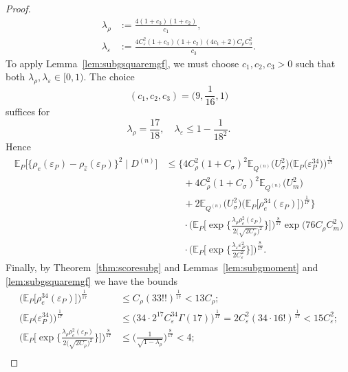 \documentclass[aos]{imsart}
\newcommand{\E}{\mathbb{E}}
\begin{document}
\begin{proof}
\begin{align*}
			\lambda_\rho &:= \frac{4(1+c_3)(1+c_2)}{c_1},\\
			\lambda_\varepsilon &:= \frac{4C_\varepsilon^2 (1+c_3)(1+c_2)(4c_1+2)C_\rho C_\sigma^2}{c_3}.
		\end{align*}
		To apply Lemma~\ref{lem:subgsquaremgf}, we must choose $c_1,c_2,c_3>0$ such that both $\lambda_\rho, \lambda_\varepsilon \in [0,1)$. The choice
		\begin{equation*}
			(c_1, c_2, c_3) = \bigg(9, \frac{1}{16}, 1\bigg)
		\end{equation*}
		suffices for 
		\begin{equation*}
			\lambda_\rho = \frac{17}{18},\quad \lambda_\varepsilon \leq 1-\frac1{18^2}.
		\end{equation*}
		Hence \begin{align*}
			\E_P\Big[\big\{\rho_{e}(\varepsilon_P)-\rho_{\hat\varepsilon}(\varepsilon_P)\big\}^2 \; \Big| \; D^{(n)}\Big] &\leq 
			\Bigg\{ 4C_\rho^2(1+C_\sigma)^2 \E_{Q^{(n)}} \big( U_\sigma^2\big)\Big(\E_P\big(\varepsilon_P^{34}\big)\Big)^{\frac{1}{17}} \\
			&\phantom{\leq \bigg\{ }+ 4C_\rho^2(1+C_\sigma)^2 \E_{Q^{(n)}} \big(U_m^2\big) \\
			&\phantom{\leq \bigg\{ }+ 2\E_{Q^{(n)}}\big(U_\sigma^2\big)\Big(\E_P\big[\rho_{e}^{34}(\varepsilon_P)\big]\Big)^{\frac{1}{17}} \bigg\} \\
			&\phantom{\leq \Bigg\{ } \cdot \Bigg(\E_P\Bigg[\exp\Bigg\{ \frac{\lambda_\rho \rho_{e}^2(\varepsilon_P)}{2\big(\sqrt{2C_\rho}\big)^2} \Bigg\} \Bigg]\Bigg)^{\frac8{17}}  \exp\big(76 C_\rho C_m^2\big)  \\
			&\phantom{\leq \Bigg\{ } \cdot\bigg(\E_P\bigg[ \exp\bigg\{\frac{\lambda_\varepsilon \varepsilon_P^2}{2C_\varepsilon^2}\bigg\}\bigg]\bigg)^{\frac8{17}}.
		\end{align*}
		Finally, by Theorem~\ref{thm:scoresubg} and Lemmas~\ref{lem:subgmoment} and \ref{lem:subgsquaremgf} we have the bounds \begin{align*}
			\Big(\E_P\big[\rho_{e}^{34}(\varepsilon_P)\big]\Big)^{\frac{1}{17}} &\leq C_\rho (33!!)^\frac{1}{17} < 13 C_\rho;\\
			\Big(\E_P\big(\varepsilon_P^{34}\big)\Big)^{\frac{1}{17}}  &\leq \big(34 \cdot 2^{17} C_\varepsilon^{34} \Gamma(17)\big)^\frac1{17} = 2C_\varepsilon^2(34\cdot 16!)^\frac1{17} < 15C_\varepsilon^2;\\
			\Bigg(\E_P\Bigg[\exp\Bigg\{ \frac{\lambda_\rho \rho_{e}^2(\varepsilon_P)}{2\big(\sqrt{2C_\rho}\big)^2} \Bigg\} \Bigg]\Bigg)^{\frac8{17}} &\leq \bigg(\frac{1}{\sqrt{1-\lambda_\rho}}\bigg)^{\frac8{17}} <4;\\

\end{align*}
\end{proof}
\end{document}
